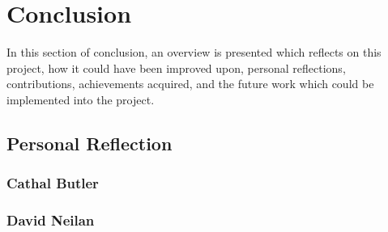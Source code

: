 \chapter{Conclusion}
In this section of conclusion, an overview is presented which reflects on this project, how it could have been improved upon, personal reflections, contributions, achievements acquired, and the future work which could be implemented into the project.

\section{Personal Reflection}
\subsection{Cathal Butler}
\subsection{David Neilan}
